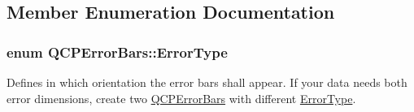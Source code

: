 \subsection{Member Enumeration Documentation}
\subsubsection[{\texorpdfstring{Error\+Type}{ErrorType}}]{\setlength{\rightskip}{0pt plus 5cm}enum {\bf Q\+C\+P\+Error\+Bars\+::\+Error\+Type}}\hypertarget{class_q_c_p_error_bars_a95f0220f11a72648b96480a85ce26474}{}\label{class_q_c_p_error_bars_a95f0220f11a72648b96480a85ce26474}
Defines in which orientation the error bars shall appear. If your data needs both error dimensions, create two \hyperlink{class_q_c_p_error_bars}{Q\+C\+P\+Error\+Bars} with different \hyperlink{class_q_c_p_error_bars_a95f0220f11a72648b96480a85ce26474}{Error\+Type}.

